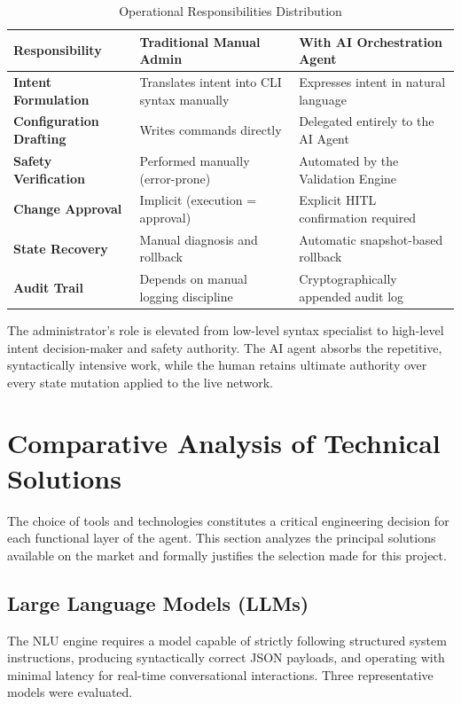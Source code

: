 \begin{table}[htbp]
    \small
    \centering
    \renewcommand{\arraystretch}{1.5}
    \begin{tabular}{|p{4.0cm}|p{5.5cm}|p{5.0cm}|}
        \hline
        \textbf{Responsibility} & \textbf{Traditional Manual Admin} & \textbf{With AI Orchestration Agent} \\
        \hline
        \textbf{Intent Formulation} & Translates intent into CLI syntax manually & Expresses intent in natural language \\
        \hline
        \textbf{Configuration Drafting} & Writes commands directly & Delegated entirely to the AI Agent \\
        \hline
        \textbf{Safety Verification} & Performed manually (error-prone) & Automated by the Validation Engine \\
        \hline
        \textbf{Change Approval} & Implicit (execution = approval) & Explicit HITL confirmation required \\
        \hline
        \textbf{State Recovery} & Manual diagnosis and rollback & Automatic snapshot-based rollback \\
        \hline
        \textbf{Audit Trail} & Depends on manual logging discipline & Cryptographically appended audit log \\
        \hline
    \end{tabular}
    \caption{Operational Responsibilities Distribution}
    \label{tab:roles_actors}
\end{table}

The administrator's role is elevated from low-level syntax specialist to high-level intent decision-maker and safety authority. The AI agent absorbs the repetitive, syntactically intensive work, while the human retains ultimate authority over every state mutation applied to the live network.

\section{Comparative Analysis of Technical Solutions}
The choice of tools and technologies constitutes a critical engineering decision for each functional layer of the agent. This section analyzes the principal solutions available on the market and formally justifies the selection made for this project.

\subsection{Large Language Models (LLMs)}
The NLU engine requires a model capable of strictly following structured system instructions, producing syntactically correct JSON payloads, and operating with minimal latency for real-time conversational interactions. Three representative models were evaluated.

